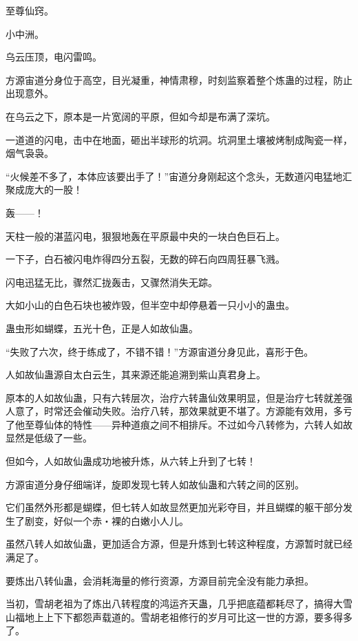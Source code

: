 
\begin{this_body}

至尊仙窍。

小中洲。

乌云压顶，电闪雷鸣。

方源宙道分身位于高空，目光凝重，神情肃穆，时刻监察着整个炼蛊的过程，防止出现意外。

在乌云之下，原本是一片宽阔的平原，但如今却是布满了深坑。

一道道的闪电，击中在地面，砸出半球形的坑洞。坑洞里土壤被烤制成陶瓷一样，烟气袅袅。

“火候差不多了，本体应该要出手了！”宙道分身刚起这个念头，无数道闪电猛地汇聚成庞大的一股！

轰——！

天柱一般的湛蓝闪电，狠狠地轰在平原最中央的一块白色巨石上。

一下子，白石被闪电炸得四分五裂，无数的碎石向四周狂暴飞溅。

闪电迅猛无比，骤然汇拢轰击，又骤然消失无踪。

大如小山的白色石块也被炸毁，但半空中却停悬着一只小小的蛊虫。

蛊虫形如蝴蝶，五光十色，正是人如故仙蛊。

“失败了六次，终于练成了，不错不错！”方源宙道分身见此，喜形于色。

人如故仙蛊源自太白云生，其来源还能追溯到紫山真君身上。

原本的人如故仙蛊，只有六转层次，治疗六转蛊仙效果明显，但是治疗七转就差强人意了，时常还会催动失败。治疗八转，那效果就更不堪了。方源能有效用，多亏了他至尊仙体的特性——异种道痕之间不相排斥。不过如今八转修为，六转人如故显然是低级了一些。

但如今，人如故仙蛊成功地被升炼，从六转上升到了七转！

方源宙道分身仔细端详，旋即发现七转人如故仙蛊和六转之间的区别。

它们虽然外形都是蝴蝶，但七转人如故显然更加光彩夺目，并且蝴蝶的躯干部分发生了剧变，好似一个赤・裸的白嫩小人儿。

虽然八转人如故仙蛊，更加适合方源，但是升炼到七转这种程度，方源暂时就已经满足了。

要炼出八转仙蛊，会消耗海量的修行资源，方源目前完全没有能力承担。

当初，雪胡老祖为了炼出八转程度的鸿运齐天蛊，几乎把底蕴都耗尽了，搞得大雪山福地上上下下都怨声载道的。雪胡老祖修行的岁月可比这一世的方源，要多得多了。


\end{this_body}
